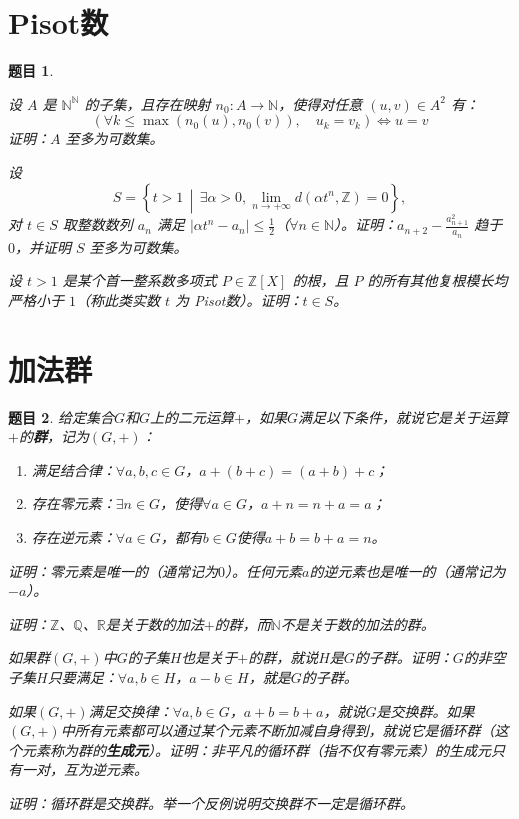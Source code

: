 \documentclass[12pt,UTF8]{ctexbook}
\theoremstyle{exercisestyle}
\newtheorem*{exercise}{题目}
\theoremstyle{solutionstyle}
\begin{document}
\section{Pisot数}
\begin{exercise}
  \begin{subquestions}
    \item 设 $A$ 是 $\mathbb{N}^{\mathbb{N}}$ 的子集，且存在映射 $n_0: A \to \mathbb{N}$，使得对任意 $(u, v) \in A^2$ 有：
    $$
    (\forall k \leq \max(n_0(u), n_0(v)), \quad u_k = v_k) \iff u = v
    $$
    证明：$A$ 至多为可数集。

    \item 设 
    $$S = \left\{ t > 1 \,\middle|\, \exists \alpha > 0, \lim_{n \to +\infty} d(\alpha t^n, \mathbb{Z}) = 0 \right\},$$
    对 $t \in S$ 取整数数列 $a_n$ 满足 $|\alpha t^n - a_n| \leq \frac{1}{2}$（$\forall n \in \mathbb{N}$）。证明：$a_{n+2} - \frac{a_{n+1}^2}{a_n}$ 趋于 $0$，并证明 $S$ 至多为可数集。

    \item 设 $t > 1$ 是某个首一整系数多项式 $P \in \mathbb{Z}[X]$ 的根，且 $P$ 的所有其他复根模长均严格小于 $1$（称此类实数 $t$ 为 \emph{Pisot数}）。证明：$t \in S$。
  \end{subquestions}
\end{exercise}

\section{加法群}
\begin{exercise}
    给定集合$G$和$G$上的二元运算$+$，如果$G$满足以下条件，就说它是关于运算$+$的\textbf{群}，记为$(G,+)$：
    \begin{enumerate}[label=\arabic*.]
        \item 满足结合律：$\forall a, b, c \in G$，$a + (b + c) = (a + b) + c$；
        \item 存在零元素：$\exists n \in G$，使得$\forall a \in G$，$a + n = n + a = a$；
        \item 存在逆元素：$\forall a \in G$，都有$b \in G$使得$a + b = b + a = n$。
    \end{enumerate}
    \begin{subquestions}
        \item 证明：零元素是唯一的（通常记为$0$）。任何元素$a$的逆元素也是唯一的（通常记为$-a$）。
        \item 证明：$\mathbb{Z}$、$\mathbb{Q}$、$\mathbb{R}$是关于数的加法$+$的群，而$\mathbb{N}$不是关于数的加法的群。
        \item 如果群$(G, +)$中$G$的子集$H$也是关于$+$的群，就说$H$是$G$的子群。证明：$G$的非空子集$H$只要满足：$\forall a, b \in H$，$a - b \in H$，就是$G$的子群。
        \item 如果$(G,+)$满足交换律：$\forall a, b \in G$，$a + b = b + a$，就说$G$是交换群。如果$(G,+)$中所有元素都可以通过某个元素不断加减自身得到，就说它是循环群（这个元素称为群的\textbf{生成元}）。证明：非平凡的循环群（指不仅有零元素）的生成元只有一对，互为逆元素。
        \item 证明：循环群是交换群。举一个反例说明交换群不一定是循环群。
    \end{subquestions}
\end{exercise}
\end{document}
